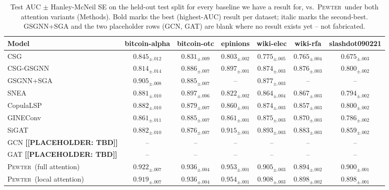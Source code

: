 \documentclass[letterpaper]{article} %
\newcommand{\method}{\textsc{Pewter}\xspace}
\newcommand{\ph}[1]{\textbf{[#1]}}  %
\theoremstyle{plain}
\theoremstyle{definition}
\begin{document}
\begin{table}[t!]
\centering
\scriptsize
\begin{tabular}{lcccccc}
\toprule
Model & bitcoin-alpha & bitcoin-otc & epinions & wiki-elec & wiki-rfa & slashdot090221 \\
\midrule
CSG & $0.845_{\pm.012}$ & $0.831_{\pm.009}$ & $0.803_{\pm.002}$ & $0.775_{\pm.005}$ & $0.765_{\pm.004}$ & $0.675_{\pm.003}$ \\
CSG-GSGNN & $0.814_{\pm.014}$ & $0.886_{\pm.007}$ & $0.897_{\pm.001}$ & $0.874_{\pm.003}$ & $0.876_{\pm.003}$ & $0.800_{\pm.002}$ \\
GSGNN+SGA & $0.905_{\pm.008}$ & $0.885_{\pm.007}$ & -- & $0.877_{\pm.003}$ & -- & -- \\
SNEA & $0.881_{\pm.010}$ & $\mathit{0.897_{\pm.006}}$ & $0.822_{\pm.002}$ & $0.864_{\pm.004}$ & $0.867_{\pm.003}$ & $0.794_{\pm.002}$ \\
CopulaLSP & $0.882_{\pm.010}$ & $0.879_{\pm.007}$ & $0.860_{\pm.001}$ & $0.874_{\pm.003}$ & $0.857_{\pm.003}$ & $0.800_{\pm.002}$ \\
GINEConv & $0.861_{\pm.011}$ & $0.885_{\pm.007}$ & $0.861_{\pm.001}$ & $0.875_{\pm.003}$ & $0.870_{\pm.003}$ & $0.786_{\pm.002}$ \\
SiGAT & $0.882_{\pm.010}$ & $0.876_{\pm.007}$ & $0.915_{\pm.001}$ & $0.893_{\pm.003}$ & $0.883_{\pm.003}$ & $0.859_{\pm.002}$ \\
GCN \ph{[PLACEHOLDER: TBD]} & -- & -- & -- & -- & -- & -- \\
GAT \ph{[PLACEHOLDER: TBD]} & -- & -- & -- & -- & -- & -- \\
\midrule
\method\ (full attention) & $\mathbf{0.922_{\pm.007}}$ & $\mathbf{0.936_{\pm.004}}$ & $\mathit{0.953_{\pm.001}}$ & $\mathit{0.905_{\pm.003}}$ & $\mathit{0.894_{\pm.002}}$ & $\mathbf{0.900_{\pm.001}}$ \\
\method\ (local attention) & $\mathit{0.919_{\pm.007}}$ & $\mathbf{0.936_{\pm.004}}$ & $\mathbf{0.954_{\pm.001}}$ & $\mathbf{0.908_{\pm.003}}$ & $\mathbf{0.898_{\pm.002}}$ & $\mathit{0.898_{\pm.001}}$ \\
\bottomrule
\end{tabular}
\caption{Test AUC $\pm$ Hanley-McNeil SE on the held-out test split for every baseline we have a result for, vs.\ \method\ under both attention variants (Methods). Bold marks the best (highest-AUC) result per dataset; italic marks the second-best. GSGNN+SGA and the two placeholder rows (GCN, GAT) are blank where no result exists yet -- not fabricated.}
\label{tab:result1}
\end{table}
\end{document}
